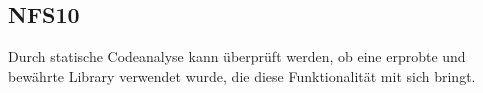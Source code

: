 \subsection*{NFS10}
Durch statische Codeanalyse kann überprüft werden, ob eine erprobte und bewährte Library verwendet wurde,
die diese Funktionalität mit sich bringt.